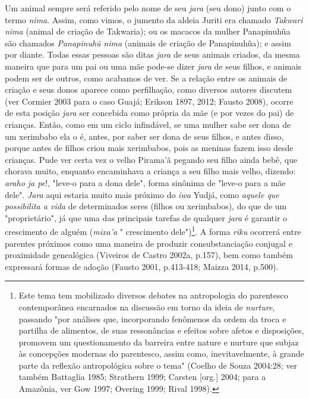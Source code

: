 Um animal sempre será referido pelo nome de seu \emph{jara} (seu dono)
junto com o termo \emph{nima}. Assim, como vimos, o jumento da aldeia
Juriti era chamado \emph{Takwari} \emph{nima} (animal de criação de
Takwaria); ou os macacos da mulher Panapinuhũa são chamados
\emph{Panapinuhũ} \emph{nima} (animais de criação de Panapinuhũa); e
assim por diante. Todas essas pessoas são ditas \emph{jara} de seus
animais criados, da mesma maneira que para um pai ou uma mãe pode-se
dizer \emph{jara} de seus filhos, e animais podem ser de outros, como
acabamos de ver. Se a relação entre os animais de criação e seus donos
aparece como perfilhação, como diversos autores discutem (ver Cormier
2003 para o caso Guajá; Erikson 1897, 2012; Fausto 2008), ocorre de esta
posição \emph{jara} ser concebida como própria da mãe (e por vezes do
pai) de crianças. Então, como em um ciclo infindável, se uma mulher sabe
ser dona de um xerimbabo ela o é, antes, por saber ser dona de seus
filhos, e antes disso, porque antes de filhos criou mais xerimbabos,
pois as meninas fazem isso desde crianças. Pude ver certa vez o velho
Pirama'ã pegando seu filho ainda bebê, que chorava muito, enquanto
encaminhava a criança a seu filho mais velho, dizendo: \emph{araho ja
pe}!, "leve-o para a dona dele", forma sinônima de "leve-o para a mãe
dele". \emph{Jara} aqui estaria muito mais próximo do \emph{iwa} Yudjá,
como \emph{aquele que possibilita a vida} de determinados seres (filhos
ou xerimbabos), do que de um "proprietário", já que uma das principais
tarefas de qualquer \emph{jara} é garantir o crescimento de alguém
(\emph{mixa'a} " crescimento dele")\footnote{Este tema tem mobilizado
  diversos debates na antropologia do parentesco contemporânea
  encarnados na discussão em torno da ideia de \emph{nurture}, passando
  "por análises que, incorporando fenômenos da ordem da troca e partilha
  de alimentos, de suas ressonâncias e efeitos sobre afetos e
  disposições, promovem um questionamento da barreira entre nature e
  nurture que subjaz às concepções modernas do parentesco, assim como,
  inevitavelmente, à grande parte da reflexão antropológica sobre o
  tema" (Coelho de Souza 2004:28; ver também Battaglia 1985; Strathern
  1999; Carsten {[}org.{]} 2004; para a Amazônia, ver Gow 1997; Overing
  1999; Rival 1998).}. A forma \emph{riku} ocorrerá entre parentes
próximos como uma maneira de produzir consubstanciação conjugal e
proximidade genealógica (Viveiros de Castro 2002a, p.157), bem como
também expressará formas de adoção (Fausto 2001, p.413-418; Maizza 2014,
p.500).

